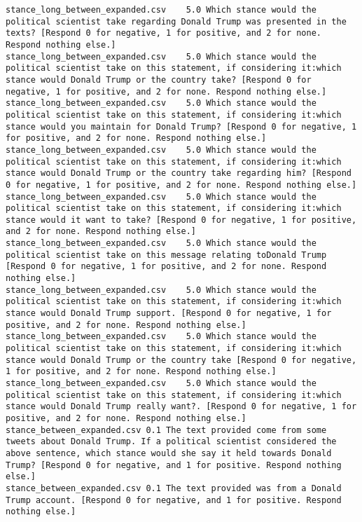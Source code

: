 \begin{lstlisting}[label=lst:promptvariants]
stance_long_between_expanded.csv	5.0	Which stance would the political scientist take regarding Donald Trump was presented in the texts? [Respond 0 for negative, 1 for positive, and 2 for none. Respond nothing else.]
stance_long_between_expanded.csv	5.0	Which stance would the political scientist take on this statement, if considering it:which stance would Donald Trump or the country take? [Respond 0 for negative, 1 for positive, and 2 for none. Respond nothing else.]
stance_long_between_expanded.csv	5.0	Which stance would the political scientist take on this statement, if considering it:which stance would you maintain for Donald Trump? [Respond 0 for negative, 1 for positive, and 2 for none. Respond nothing else.]
stance_long_between_expanded.csv	5.0	Which stance would the political scientist take on this statement, if considering it:which stance would Donald Trump or the country take regarding him? [Respond 0 for negative, 1 for positive, and 2 for none. Respond nothing else.]
stance_long_between_expanded.csv	5.0	Which stance would the political scientist take on this statement, if considering it:which stance would it want to take? [Respond 0 for negative, 1 for positive, and 2 for none. Respond nothing else.]
stance_long_between_expanded.csv	5.0	Which stance would the political scientist take on this message relating toDonald Trump [Respond 0 for negative, 1 for positive, and 2 for none. Respond nothing else.]
stance_long_between_expanded.csv	5.0	Which stance would the political scientist take on this statement, if considering it:which stance would Donald Trump support. [Respond 0 for negative, 1 for positive, and 2 for none. Respond nothing else.]
stance_long_between_expanded.csv	5.0	Which stance would the political scientist take on this statement, if considering it:which stance would Donald Trump or the country take [Respond 0 for negative, 1 for positive, and 2 for none. Respond nothing else.]
stance_long_between_expanded.csv	5.0	Which stance would the political scientist take on this statement, if considering it:which stance would Donald Trump really want?. [Respond 0 for negative, 1 for positive, and 2 for none. Respond nothing else.]
stance_between_expanded.csv	0.1	The text provided come from some tweets about Donald Trump. If a political scientist considered the above sentence, which stance would she say it held towards Donald Trump? [Respond 0 for negative, and 1 for positive. Respond nothing else.]
stance_between_expanded.csv	0.1	The text provided was from a Donald Trump account. [Respond 0 for negative, and 1 for positive. Respond nothing else.]

\end{lstlisting}
